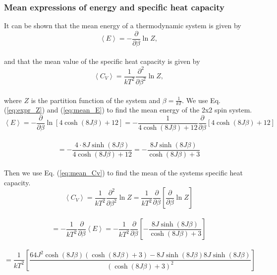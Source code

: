 \documentclass[12pt]{article}
\begin{document}
\begin{flushleft}
\subsubsection{Mean expressions of energy and specific heat capacity}
It can be shown that the mean energy of a thermodynamic	system is given by
\vspace{5mm}
\begin{equation}\label{eq:mean_E}
\left< E \right> = -\frac{\partial }{\partial \beta}\ln Z,
\end{equation}\\
\vspace{5mm}
and that the mean value of the specific heat capacity is given by
\vspace{5mm}
\begin{equation}\label{eq:mean_Cv}
\left< C_V\right> = \frac{1}{kT^2}\frac{\partial^2}{\partial\beta^2}\ln Z,
\end{equation}\\
\vspace{5mm}
where $Z$ is the partition function of the system and $\beta = \frac{1}{kT}$.
We use Eq. (\ref{eq:expr_Z}) and (\ref{eq:mean_E}) to find the mean energy of the 2x2 spin system.
\vspace{5mm}
$$\left< E \right> = -\frac{\partial}{\partial\beta}\ln \left[ 4\cosh(8J\beta) + 12 \right] = -\frac{1}{4\cosh(8J\beta) + 12}\frac{\partial}{\partial\beta}\left[4\cosh(8J\beta) + 12\right]$$\\
\vspace{5mm}
$$ = -\frac{4\cdot 8J\sinh(8J\beta)}{4\cosh(8J\beta) + 12} = -\frac{8J\sinh(8J\beta)}{\cosh(8J\beta) + 3}$$\\
\vspace{5mm}
Then we use Eq. (\ref{eq:mean_Cv}) to find the mean of the systems specific heat capacity.
\vspace{5mm}
$$\left<C_V\right> = \frac{1}{kT^2}\frac{\partial^2}{\partial\beta^2}\ln Z = \frac{1}{kT^2}\frac{\partial}{\partial\beta}\left[\frac{\partial}{\partial\beta}\ln Z\right]$$\\
\vspace{5mm} 
$$ = -\frac{1}{kT^2}\frac{\partial}{\partial\beta}\left< E\right> = -\frac{1}{kT^2}\frac{\partial}{\partial\beta}\left[-\frac{8J\sinh(8J\beta)}{\cosh(8J\beta) + 3}\right]$$\\
\vspace{10mm}
$$ = \frac{1}{kT^2} \left[\frac{64J^2\cosh(8J\beta)\left(\cosh(8J\beta) + 3\right) - 8J\sinh(8J\beta)8J\sinh(8J\beta)}{\left(\cosh(8J\beta) + 3\right)^2}\right]$$\\
\vspace{5mm}


\end{flushleft}
\end{document}
